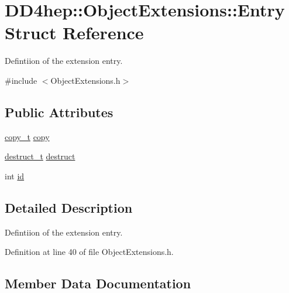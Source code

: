 \hypertarget{struct_d_d4hep_1_1_object_extensions_1_1_entry}{}\section{D\+D4hep\+:\+:Object\+Extensions\+:\+:Entry Struct Reference}
\label{struct_d_d4hep_1_1_object_extensions_1_1_entry}


Defintiion of the extension entry.  




{\ttfamily \#include $<$Object\+Extensions.\+h$>$}

\subsection*{Public Attributes}
\begin{DoxyCompactItemize}
\item 
\hyperlink{class_d_d4hep_1_1_object_extensions_afb8207da7e2d6d5e3018cc7b5c997f6d}{copy\+\_\+t} \hyperlink{struct_d_d4hep_1_1_object_extensions_1_1_entry_a97a6e0981c8602449ecd304376740cc5}{copy}
\item 
\hyperlink{class_d_d4hep_1_1_object_extensions_a705a3524f9097577069a83993a39a9b2}{destruct\+\_\+t} \hyperlink{struct_d_d4hep_1_1_object_extensions_1_1_entry_a4a7454a4a71075f91c6c260025eaf89c}{destruct}
\item 
int \hyperlink{struct_d_d4hep_1_1_object_extensions_1_1_entry_a96f2362da856b43495f39a9d0ef48c0f}{id}
\end{DoxyCompactItemize}


\subsection{Detailed Description}
Defintiion of the extension entry. 

Definition at line 40 of file Object\+Extensions.\+h.



\subsection{Member Data Documentation}
\hypertarget{struct_d_d4hep_1_1_object_extensions_1_1_entry_a97a6e0981c8602449ecd304376740cc5}{}\label{struct_d_d4hep_1_1_object_extensions_1_1_entry_a97a6e0981c8602449ecd304376740cc5} 
